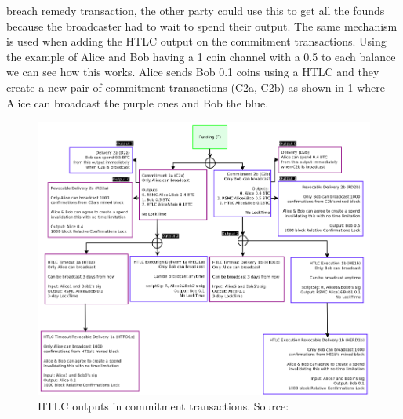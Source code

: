 breach remedy transaction, the other party could use this to get all the founds because the broadcaster had to wait to spend their output.
The same mechanism is used when adding the HTLC output on the commitment transactions. Using the example of Alice and Bob having a 1 coin channel with a 0.5 to each balance we can see how this works. Alice sends Bob 0.1 coins using a HTLC and they create a new pair of commitment transactions (C2a, C2b) as shown in \cref{fig:htlc_commit} where Alice can broadcast the purple ones and Bob the blue.
\\


\begin{figure}[ht]
    \centering
    \includegraphics[width=14cm]{figures/ln_htlc.png}
    \caption{HTLC outputs in commitment transactions.  Source: \cite{poon2015bitcoin}}
    \label{fig:htlc_commit}
\end{figure}


